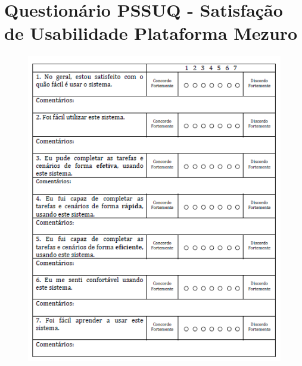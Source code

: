 \newpage
\section{Questionário PSSUQ - Satisfação de Usabilidade Plataforma Mezuro}
\label{questionario-pssuq}
\graphicspath{{figuras/}}
\begin{figure}[H]
\centering
\includegraphics[width=1.0\textwidth]{PSSUQ1}
\label{pssuq1}
\end{figure}

